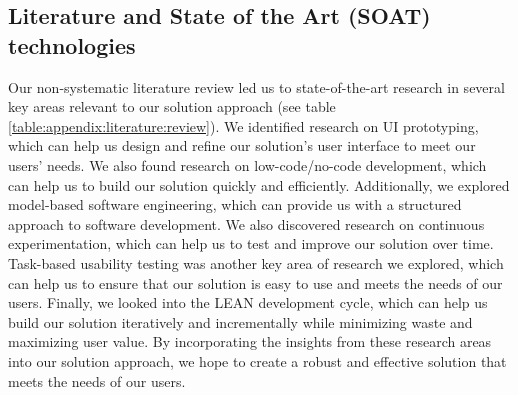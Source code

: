 \subsection*{Literature and State of the Art (SOAT) technologies}
Our non-systematic literature review led us to state-of-the-art research in several key areas relevant to our solution approach (see table \ref{table:appendix:literature:review}). 
We identified research on UI prototyping, which can help us design and refine our solution's user interface to meet our users' needs. 
We also found research on low-code/no-code development, which can help us to build our solution quickly and efficiently. 
Additionally, we explored model-based software engineering, which can provide us with a structured approach to software development. 
We also discovered research on continuous experimentation, which can help us to test and improve our solution over time. 
Task-based usability testing was another key area of research we explored, which can help us to ensure that our solution is easy to use and meets the needs of our users. 
Finally, we looked into the LEAN development cycle, which can help us build our solution iteratively and incrementally while minimizing waste and maximizing user value. 
By incorporating the insights from these research areas into our solution approach, we hope to create a robust and effective solution that meets the needs of our users.
\label{section:appendix:literature}
